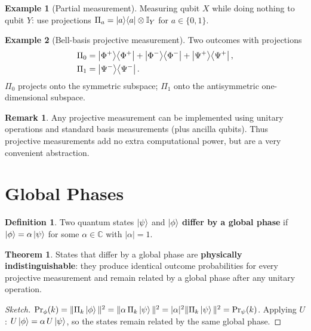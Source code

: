 \documentclass[11pt]{article}
\theoremstyle{definition}
\newtheorem{definition}{Definition}[section]
\newtheorem{example}{Example}[section]
\newtheorem{remark}{Remark}[section]
\newtheorem{theorem}{Theorem}[section]
\begin{document}
\begin{example}[Partial measurement]
Measuring qubit $X$ while doing nothing to qubit $Y$: use projections $\Pi_a = \ket{a}\!\bra{a}\otimes\mathbb{I}_Y$ for $a\in\{0,1\}$.
\end{example}

\begin{example}[Bell-basis projective measurement]
Two outcomes with projections
\begin{align}
    \Pi_0 &= \ket{\Phi^+}\!\bra{\Phi^+}+\ket{\Phi^-}\!\bra{\Phi^-}+\ket{\Psi^+}\!\bra{\Psi^+}, \\
    \Pi_1 &= \ket{\Psi^-}\!\bra{\Psi^-}.
\end{align}
$\Pi_0$ projects onto the symmetric subspace; $\Pi_1$ onto the antisymmetric one-dimensional subspace.
\end{example}

\begin{remark}
Any projective measurement can be implemented using unitary operations and standard basis measurements (plus ancilla qubits).  Thus projective measurements add no extra computational power, but are a very convenient abstraction.
\end{remark}

\section{Global Phases}

\begin{definition}
Two quantum states $\ket{\psi}$ and $\ket{\phi}$ \textbf{differ by a global phase} if $\ket{\phi}=\alpha\ket{\psi}$ for some $\alpha\in\mathbb{C}$ with $|\alpha|=1$.
\end{definition}

\begin{theorem}
States that differ by a global phase are \textbf{physically indistinguishable}: they produce identical outcome probabilities for every projective measurement and remain related by a global phase after any unitary operation.
\end{theorem}

\begin{proof}[Sketch]
$\Pr_\phi(k)=\|\Pi_k\ket{\phi}\|^2 = \|\alpha\,\Pi_k\ket{\psi}\|^2 = |\alpha|^2\|\Pi_k\ket{\psi}\|^2 = \Pr_\psi(k)$.  Applying $U$: $U\ket{\phi}=\alpha\,U\ket{\psi}$, so the states remain related by the same global phase.
\end{proof}
\end{document}
